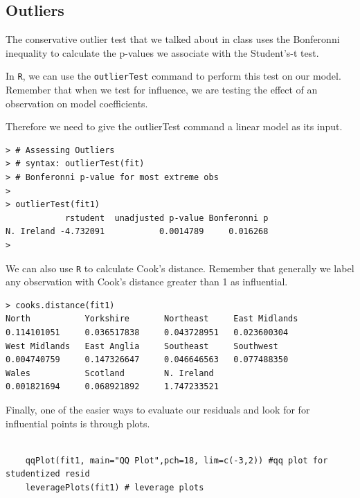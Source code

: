 \documentclass[residuals.tex]{subfiles}
\begin{document}
\newpage
\subsection*{Outliers}




The conservative outlier test that we talked about in class uses the
Bonferonni inequality to calculate the p-values we associate with the
Student's-t test. 

In \texttt{R}, we can use the \texttt{outlierTest} command to perform this
test on our model. Remember that when we test for influence, we are testing
the effect of an observation on model coefficients. 

Therefore we need to
give the outlierTest command a linear model as its input.
\begin{framed}
	\begin{verbatim}
> # Assessing Outliers
> # syntax: outlierTest(fit) 
> # Bonferonni p-value for most extreme obs
>
> outlierTest(fit1)
            rstudent  unadjusted p-value Bonferonni p
N. Ireland -4.732091           0.0014789     0.016268
> 
\end{verbatim}
\end{framed}
\noindent We can also use \texttt{R} to calculate Cook's distance. 
Remember that generally we
label any observation with Cook's distance greater than 1 as influential.
\begin{framed}
\begin{verbatim}
> cooks.distance(fit1)
North           Yorkshire       Northeast     East Midlands 
0.114101051     0.036517838     0.043728951   0.023600304 
West Midlands   East Anglia     Southeast     Southwest 
0.004740759     0.147326647     0.046646563   0.077488350 
Wales           Scotland        N. Ireland 
0.001821694     0.068921892     1.747233521 
\end{verbatim}
\end{framed}

Finally, one of the easier ways to evaluate our residuals and look for
for influential points is through plots. 

\begin{framed}
	\begin{verbatim}
	
	qqPlot(fit1, main="QQ Plot",pch=18, lim=c(-3,2)) #qq plot for studentized resid 
	leveragePlots(fit1) # leverage plots
	\end{verbatim}
\end{framed}
\end{document}
